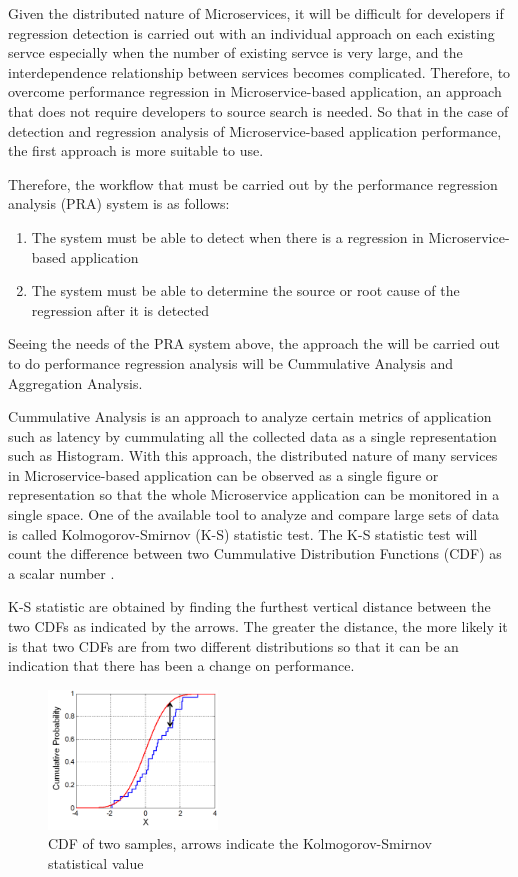 \documentclass[conference]{configs/IEEEtran}
\begin{document}
Given the distributed nature of Microservices, it will be difficult for developers if regression detection is carried out with an individual approach on each existing servce especially when the number of existing servce is very large, and the interdependence relationship between services becomes complicated. Therefore, to overcome performance regression in Microservice-based application, an approach that does not require developers to source search is needed. So that in the case of detection and regression analysis of Microservice-based application performance, the first approach is more suitable to use.

Therefore, the workflow that must be carried out by the performance regression analysis (PRA) system is as follows:
\begin{enumerate}
	\item The system must be able to detect when there is a regression in Microservice-based application
	\item The system must be able to determine the source or root cause of the regression after it is detected
\end{enumerate}

Seeing the needs of the PRA system above, the approach the will be carried out to do performance regression analysis will be Cummulative Analysis and Aggregation Analysis. 

Cummulative Analysis is an approach to analyze certain metrics of application such as latency by cummulating all the collected data as a single representation such as Histogram. With this approach, the distributed nature of many services in Microservice-based application can be observed as a single figure or representation so that the whole Microservice application can be monitored in a single space. One of the available tool to analyze and compare large sets of data is called Kolmogorov-Smirnov (K-S) statistic test. The K-S statistic test will count the difference between two Cummulative Distribution Functions (CDF) as a scalar number \cite{kolmogorov_1951}.

K-S statistic are obtained by finding the furthest vertical distance between the two CDFs as indicated by the arrows. The greater the distance, the more likely it is that two CDFs are from two different distributions so that it can be an indication that there has been a change on performance.
\begin{figure}[htb]
	\centering
	\includegraphics[width=0.4\textwidth]{resources/ch2/ks.png}
	\caption{CDF of two samples, arrows indicate the Kolmogorov-Smirnov statistical value \cite{wiki:ks-test}}
	\label{ks-example}
\end{figure}
\end{document}
